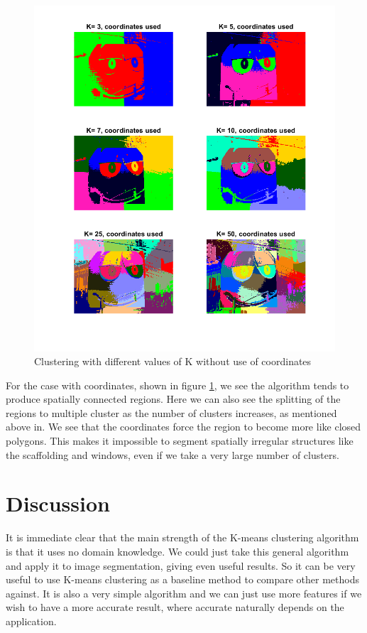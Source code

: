 \begin{figure}[h!]
\centering
\includegraphics[width =0.8\linewidth]{figures/task2/mm_coords_manyK.png}
\caption{Clustering with different values of K without use of coordinates}
\label{fig:mm:coords:manyK}
\end{figure}

For the case with coordinates, shown in figure \ref{fig:mm:coords:manyK}, we see the algorithm tends to produce spatially connected regions. Here we can also see the splitting of the regions to multiple cluster as the number of clusters increases, as mentioned above in. We see that the coordinates force the region to become more like closed polygons. This makes it impossible to segment spatially irregular structures like the scaffolding and windows, even if we take a very large number of clusters. 

\section{Discussion}
It is immediate clear that the main strength of the K-means clustering algorithm is that it uses no domain knowledge. We could just take this general algorithm and apply it to image segmentation, giving even useful results. So it can be very useful to use K-means clustering as a baseline method to compare other methods against. It is also a very simple algorithm and we can just use more features if we wish to have a more accurate result, where accurate naturally depends on the application.

